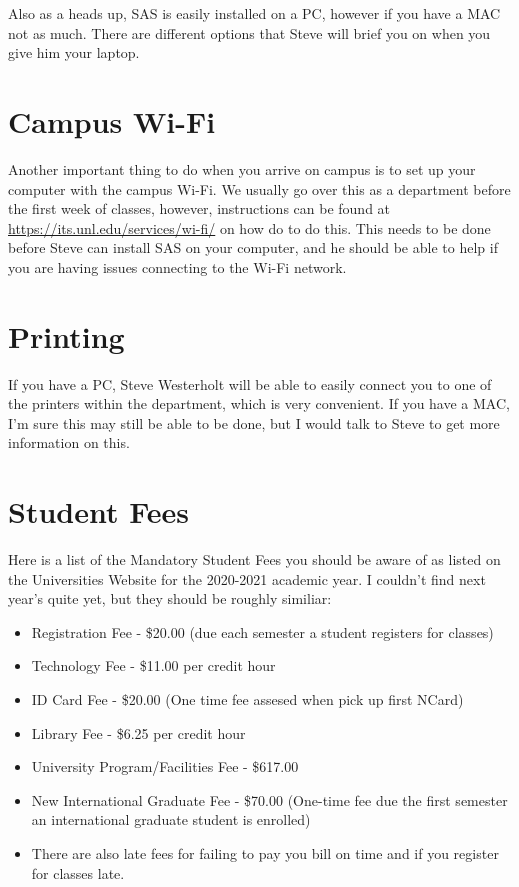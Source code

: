 \documentclass[
  12pt,
]{book}
\providecommand{\tightlist}{%
  \setlength{\itemsep}{0pt}\setlength{\parskip}{0pt}}
\begin{document}
Also as a heads up, SAS is easily installed on a PC, however if you have a MAC not as much. There are different options that Steve will brief you on when you give him your laptop.

\hypertarget{campus-wi-fi}{%
\section{Campus Wi-Fi}\label{campus-wi-fi}}

Another important thing to do when you arrive on campus is to set up your computer with the campus Wi-Fi. We usually go over this as a department before the first week of classes, however, instructions can be found at \url{https://its.unl.edu/services/wi-fi/} on how do to do this. This needs to be done before Steve can install SAS on your computer, and he should be able to help if you are having issues connecting to the Wi-Fi network.

\hypertarget{printing}{%
\section{Printing}\label{printing}}

If you have a PC, Steve Westerholt will be able to easily connect you to one of the printers within the department, which is very convenient. If you have a MAC, I'm sure this may still be able to be done, but I would talk to Steve to get more information on this.

\hypertarget{student-fees}{%
\section{Student Fees}\label{student-fees}}

Here is a list of the Mandatory Student Fees you should be aware of as listed on the Universities Website for the 2020-2021 academic year. I couldn't find next year's quite yet, but they should be roughly similiar:

\begin{itemize}
\tightlist
\item
  Registration Fee - \$20.00 (due each semester a student registers for classes)
\item
  Technology Fee - \$11.00 per credit hour
\item
  ID Card Fee - \$20.00 (One time fee assesed when pick up first NCard)
\item
  Library Fee - \$6.25 per credit hour
\item
  University Program/Facilities Fee - \$617.00
\item
  New International Graduate Fee - \$70.00 (One-time fee due the first semester an international graduate student is enrolled)
\item
  There are also late fees for failing to pay you bill on time and if you register for classes late.
\end{itemize}
\end{document}
